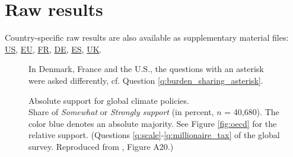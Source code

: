 \clearpage
\section{Raw results%
}\label{app:raw_results}

Country-specific raw results are also available as supplementary material files:  \href{https://github.com/bixiou/global_tax_attitudes/raw/main/paper/app_desc_stats_US.pdf}{US}, \href{https://github.com/bixiou/global_tax_attitudes/raw/main/paper/app_desc_stats_EU.pdf}{EU}, \href{https://github.com/bixiou/global_tax_attitudes/raw/main/paper/app_desc_stats_FR.pdf}{FR}, \href{https://github.com/bixiou/global_tax_attitudes/raw/main/paper/app_desc_stats_DE.pdf}{DE}, \href{https://github.com/bixiou/global_tax_attitudes/raw/main/paper/app_desc_stats_ES.pdf}{ES}, \href{https://github.com/bixiou/global_tax_attitudes/raw/main/paper/app_desc_stats_UK.pdf}{UK}.

\begin{figure}[h!]
    \caption[Absolute support for global climate policies]{Absolute support for global climate policies. \\ Share of \textit{Somewhat} or \textit{Strongly support} (in percent, $n$ = 40,680). The color blue denotes an absolute majority. See Figure \ref{fig:oecd} for the relative support. (Questions \ref{q:scale}-\ref{q:millionaire_tax} of the global survey. Reproduced from \citealp{dechezlepretre_fighting_2022}, Figure A20.)} 
    \label{fig:oecd_absolute}%
    {\footnotesize *In Denmark, France and the U.S., the questions with an asterisk were asked differently, cf. Question \ref{q:burden_sharing_asterisk}. } 
\end{figure}

